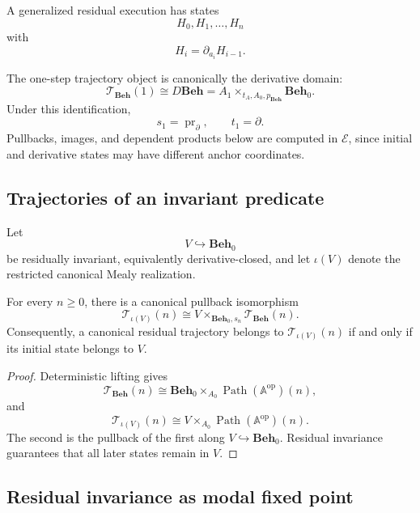 A generalized residual execution has states
\[
    H_0,H_1,\ldots,H_n
\]
with
\[
    H_i=\partial_{a_i}H_{i-1}.
\]

The one-step trajectory object is canonically the derivative domain:
\[
    \mathscr T_{\mathbf{Beh}}(1)
    \cong
    D\mathbf{Beh}
    =
    A_1\times_{t_A,A_0,p_{\mathbf{Beh}}}\mathbf{Beh}_0.
\]
Under this identification,
\[
    s_1=\operatorname{pr}_\partial,
    \qquad
    t_1=\partial.
\]
Pullbacks, images, and dependent products below are computed in
\(\mathcal E\), since initial and derivative states may have different
anchor coordinates.

\subsection{Trajectories of an invariant predicate}
\label{subsec:trajectories-invariant-predicate}

Let
\[
    V\hookrightarrow\mathbf{Beh}_0
\]
be residually invariant, equivalently derivative-closed, and let
\(\iota(V)\) denote the restricted canonical Mealy realization.

\begin{proposition}
\label{prop:trajectories-invariant-predicate}
For every \(n\geq0\), there is a canonical pullback isomorphism
\[
    \mathscr T_{\iota(V)}(n)
    \cong
    V\times_{\mathbf{Beh}_0,s_n}
    \mathscr T_{\mathbf{Beh}}(n).
\]
Consequently, a canonical residual trajectory belongs to
\(\mathscr T_{\iota(V)}(n)\) if and only if its initial state belongs to
\(V\).
\end{proposition}

\begin{proof}
Deterministic lifting gives
\[
    \mathscr T_{\mathbf{Beh}}(n)
    \cong
    \mathbf{Beh}_0
    \times_{A_0}
    \operatorname{Path}(\mathbb A^{\mathrm{op}})(n),
\]
and
\[
    \mathscr T_{\iota(V)}(n)
    \cong
    V
    \times_{A_0}
    \operatorname{Path}(\mathbb A^{\mathrm{op}})(n).
\]
The second is the pullback of the first along
\(V\hookrightarrow\mathbf{Beh}_0\). Residual invariance guarantees that
all later states remain in \(V\).
\end{proof}

\subsection{Residual invariance as modal fixed point}
\label{subsec:residual-invariance-modal-fixed-point}

